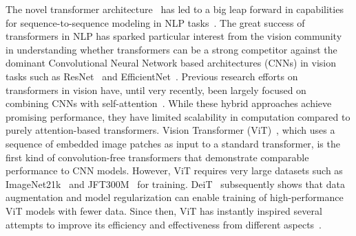 \documentclass[10pt,twocolumn,letterpaper]{article}
\begin{document}
The novel transformer architecture~\cite{Transformer_NIPS2017_Vaswani} has led to a big leap forward in capabilities for sequence-to-sequence modeling in NLP tasks~\cite{devlin2018bert}. The great success of transformers in NLP has sparked particular interest from the vision community in understanding whether transformers can be a strong competitor against the dominant Convolutional Neural Network based architectures (CNNs) in vision tasks such as ResNet~\cite{ResNet_He_2016_CVPR} and EfficientNet~\cite{efficientnet_pmlr_tan_19}. Previous research  efforts on transformers in vision have, until very recently,  been largely focused on combining CNNs with self-attention~\cite{bello2019attention, SAN_Zhao_2020_CVPR, SASA_Ramachandran_2019_NeurIPS, BoT_srinivas2021}. While these hybrid approaches achieve promising performance, they have limited scalability in computation compared to purely attention-based transformers. Vision Transformer (ViT)~\cite{ViT_dosovitskiy2021an}, which uses a sequence of embedded image patches as input to a standard transformer, is the first kind of convolution-free transformers that demonstrate comparable performance to CNN models. However, ViT requires very large datasets such as ImageNet21k~\cite{imagenet_deng2009} and JFT300M~\cite{JFT300M_ICCV_2017} for training. DeiT~\cite{DeiT_touvron2020} subsequently shows that data augmentation and model regularization can enable training of high-performance ViT models with fewer data. Since then, ViT has instantly inspired several attempts to improve its efficiency and effectiveness from different aspects~\cite{DeiT_touvron2020, tokenstotoken_yuan2021, TNT_han2021transformer,PVT_wang2021, perceiver_jaegle2021}.
\end{document}

